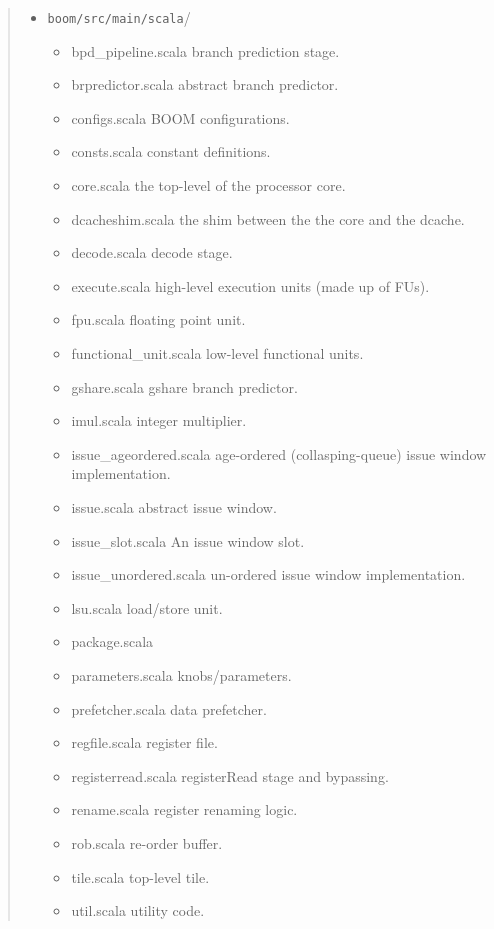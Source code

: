 \begin{quote}
\begin{itemize}
\item \verb=boom/src/main/scala=/\begin{itemize}
  \item bpd\_pipeline.scala {\footnotesize \color{red} branch prediction stage.}
  \item brpredictor.scala {\footnotesize \color{red} abstract branch predictor.}
  \item configs.scala {\footnotesize \color{red} BOOM configurations. }
  \item consts.scala {\footnotesize \color{red} constant definitions. }
  \item core.scala {\footnotesize \color{red} the top-level of the processor core.}
  \item dcacheshim.scala {\footnotesize \color{red} the shim between the the core and the dcache.}
  \item decode.scala {\footnotesize \color{red} decode stage.}
  \item execute.scala {\footnotesize \color{red} high-level execution units (made up of FUs).}
  \item fpu.scala {\footnotesize \color{red} floating point unit.}
  \item functional\_unit.scala {\footnotesize \color{red} low-level functional units.}
  \item gshare.scala {\footnotesize \color{red} gshare branch predictor.}
  \item imul.scala {\footnotesize \color{red} integer multiplier.}
  \item issue\_ageordered.scala {\footnotesize \color{red} age-ordered (collasping-queue) issue window implementation.}
  \item issue.scala {\footnotesize \color{red} abstract issue window.}
  \item issue\_slot.scala {\footnotesize \color{red} An issue window slot.}
  \item issue\_unordered.scala {\footnotesize \color{red} un-ordered issue window implementation.}
  \item lsu.scala {\footnotesize \color{red} load/store unit.}
  \item package.scala {\footnotesize \color{red} }
  \item parameters.scala {\footnotesize \color{red} knobs/parameters.}
  \item prefetcher.scala {\footnotesize \color{red} data prefetcher.}
  \item regfile.scala {\footnotesize \color{red} register file.}
  \item registerread.scala {\footnotesize \color{red} registerRead stage and bypassing.}
  \item rename.scala {\footnotesize \color{red} register renaming logic.}
  \item rob.scala {\footnotesize \color{red} re-order buffer.}
  \item tile.scala {\footnotesize \color{red} top-level tile.}
  \item util.scala {\footnotesize \color{red} utility code.}



\end{itemize}
\end{itemize}
\end{quote}

